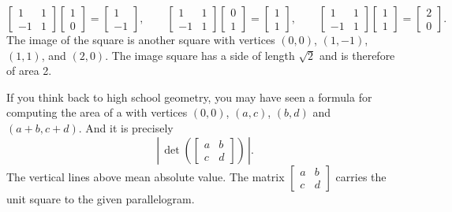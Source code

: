 \begin{equation*}
\begin{bmatrix}
1 & 1 \\
-1 & 1
\end{bmatrix}
\begin{bmatrix}
1 \\ 0
\end{bmatrix} =
\begin{bmatrix}
1 \\
-1 
\end{bmatrix}
,
\qquad
\begin{bmatrix}
1 & 1 \\
-1 & 1
\end{bmatrix}
\begin{bmatrix}
0 \\ 1
\end{bmatrix} =
\begin{bmatrix}
1 \\
1 
\end{bmatrix}
,
\qquad
\begin{bmatrix}
1 & 1 \\
-1 & 1
\end{bmatrix}
\begin{bmatrix}
1 \\ 1
\end{bmatrix} =
\begin{bmatrix}
2 \\
0 
\end{bmatrix}
.
\end{equation*}
The image of the square is another square with vertices $(0,0)$, $(1,-1)$,
$(1,1)$, and $(2,0)$.  The
image square has
a side of length $\sqrt{2}$ and is therefore of area 2.

If you think back to high school geometry, you may have seen a formula for
computing the area of a 
with vertices $(0,0)$, $(a,c)$, $(b,d)$
and $(a+b,c+d)$.  And it is precisely
\begin{equation*}
\left\lvert \, \det \left(
\begin{bmatrix} a & b \\ c & d \end{bmatrix}
\right) \, \right\lvert.
\end{equation*}
The vertical lines above mean absolute value.
The matrix $\left[ \begin{smallmatrix} a & b \\ c & d \end{smallmatrix}
\right]$
carries the unit square to the given parallelogram.


